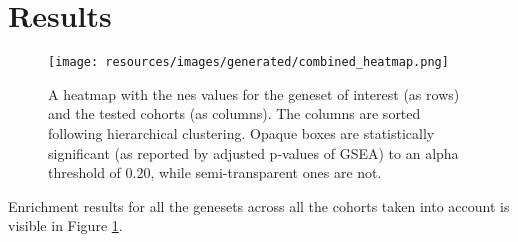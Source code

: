\section{Results}

\begin{figure}
    \centering
    \texttt{[image: resources/images/generated/combined\_heatmap.png]}
    \caption{A heatmap with the \gls{nes} values for the geneset of interest (as rows) and the tested cohorts (as columns). The columns are sorted following hierarchical clustering. Opaque boxes are statistically significant (as reported by adjusted p-values of GSEA) to an alpha threshold of $0.20$, while semi-transparent ones are not.}
    \label{fig:full_enrichment_heatmap}
\end{figure}

Enrichment results for all the genesets across all the cohorts taken into
account is visible in Figure \ref{fig:full_enrichment_heatmap}.
